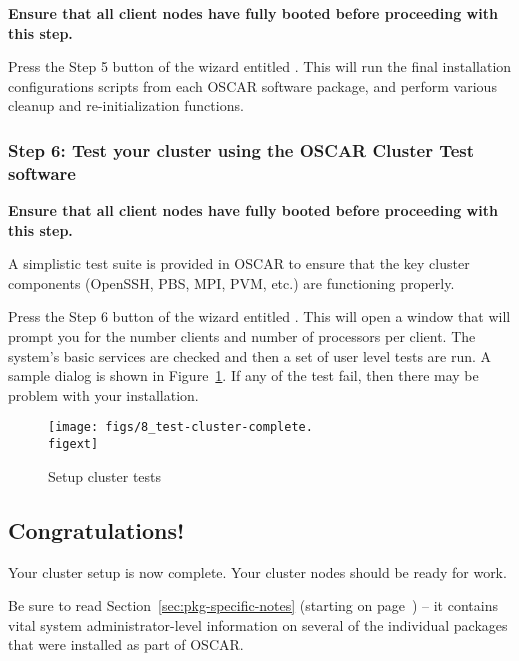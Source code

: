 {\bf Ensure that all client nodes have fully booted before proceeding
  with this step.}

Press the Step 5 button of the wizard entitled .  This will run the final installation configurations
scripts from each OSCAR software package, and perform various cleanup
and re-initialization functions.


\subsubsection{Step 6: Test your cluster using the OSCAR Cluster Test
  software}
\label{det:testcluster}
            
{\bf Ensure that all client nodes have fully booted before proceeding
  with this step.}

A simplistic test suite is provided in OSCAR to ensure that the key
cluster components (OpenSSH, PBS, MPI, PVM, etc.) are functioning
properly.

Press the Step 6 button of the wizard entitled . This will open a window that will prompt you for the number
clients and number of processors per client. The system's basic
services are checked and then a set of user level tests are run. A
sample dialog is shown in Figure~\ref{fig:detailed-setup-test}. If any
of the test fail, then there may be problem with your installation.

\begin{figure}[htbp]
  \begin{center}
    \texttt{[image: figs/8\_test-cluster-complete.\\figext]}
    \caption{Setup cluster tests}
    \label{fig:detailed-setup-test}
  \end{center}
\end{figure}


\subsection{Congratulations!}

Your cluster setup is now complete. Your cluster nodes should
be ready for work.

Be sure to read Section~\ref{sec:pkg-specific-notes} (starting on
page~\pageref{sec:pkg-specific-notes}) -- it contains vital system
administrator-level information on several of the individual packages
that were installed as part of OSCAR.


